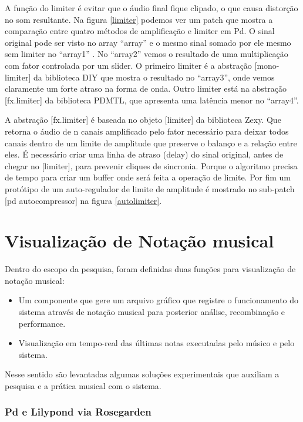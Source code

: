 \documentclass[draft]{ppgmus}
\begin{document}
A função do limiter é evitar que o áudio final fique clipado, o que causa distorção no som resultante.
Na figura \ref{limiter} podemos ver um patch que mostra a comparação entre quatro
métodos de amplificação e limiter em Pd. O sinal original pode ser
visto no array ``array'' e o mesmo sinal somado por ele mesmo sem limiter no ``array1'' .
No ``array2'' vemos o resultado de uma multiplicação com fator controlada por
um slider. O primeiro limiter é a abstração [mono-limiter] da biblioteca DIY que mostra
o resultado no ``array3'', onde vemos claramente um forte atraso na 
forma de onda. Outro limiter está na  abstração [fx.limiter\texttildelow] da 
biblioteca PDMTL, que apresenta uma latência menor no ``array4''.

A abstração [fx.limiter\texttildelow] é baseada no objeto [limiter\texttildelow] da biblioteca Zexy.
Que retorna o áudio de n canais amplificado pelo fator necessário para
deixar todos canais dentro de um limite de amplitude que preserve 
o balanço e a relação entre eles. É necessário criar uma linha de atraso
(delay) do sinal original, antes de chegar no [limiter\texttildelow],
para prevenir cliques de sincronia. Porque o algoritmo precisa de
tempo para criar um buffer onde será feita a operação de limite.
Por fim um protótipo de um auto-regulador de limite de amplitude é mostrado
no sub-patch [pd autocompressor] na figura \ref{autolimiter}.


\section{Visualização de Notação musical}
\label{sec-notacao}



Dentro do escopo da pesquisa, foram definidas duas funções
para visualização de notação musical:

\begin{itemize}
 \item Um componente que gere um arquivo gráfico que registre o funcionamento
do sistema através de notação musical para posterior análise, recombinação e performance.
 \item Visualização em tempo-real das últimas notas executadas pelo músico e pelo sistema.
\end{itemize}


Nesse sentido são levantadas algumas soluções experimentais que auxiliam a pesquisa e 
a prática musical com o sistema.




\subsubsection{Pd e Lilypond via Rosegarden}
\end{document}

